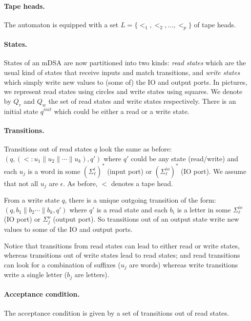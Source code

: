 \paragraph*{Tape heads.} The automaton is equipped with a set $L = \{ \lt_1, \lt_2, \dots, \lt_p\}$ of tape heads. 

\paragraph*{States.} States of an mDSA are now partitioned into two kinds: \emph{read states} which are the usual kind of states that receive inputs and match transitions, and \emph{write states} which simply write new values to (some of) the IO and output ports. In pictures, we represent read states using circles and write states using squares. We denote by $Q_r$ and $Q_w$ the set of read states and write states respectively. There is an initial state $q^{init}$ which could be either a read or a write state. 

\paragraph*{Transitions.} Transitions out of read states $q$ look the same as before: $(q, (\lt: u_1 \parallel u_2 \parallel \cdots \parallel u_k), q')$ where $q'$ could be any state (read/write) and each $u_j$ is a word in some $(\Sigma^i_\ell)^*$ (input port) or $(\Sigma^{io}_\ell)^*$ (IO port).  We assume that not all $u_j$ are $\epsilon$. As before, $\lt$ denotes a tape head. 

From a write state $q$, there is a unique outgoing transition of the form: $(q, b_1 \parallel b_2 \cdots \parallel b_k, q')$ where $q'$ is a read state and each $b_i$ is a letter in some  $\Sigma^{io}_\ell$ (IO port) or $\Sigma^o_j$ (output port). So transitions out of an output state write new values to some of the IO and output ports.

Notice that transitions from read states can lead to either read or write states, whereas transitions out of write states lead to read states; and read transitions can look for a combination of suffixes ($u_j$ are words) whereas write transitions write a single letter ($b_j$ are letters).

\paragraph*{Acceptance condition.} The acceptance condition is given by a set of transitions out of read states.

